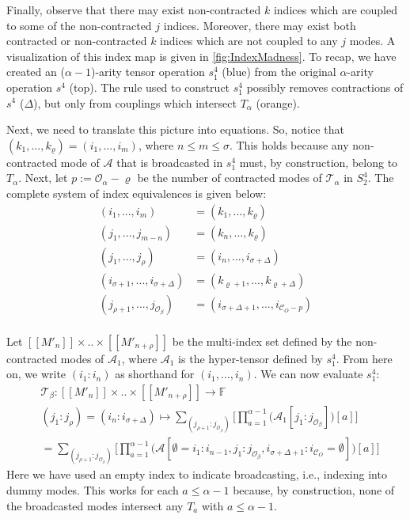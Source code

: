 \documentclass{article}
\theoremstyle{plain}
\theoremstyle{definition}
\theoremstyle{remark}
\newcommand{\cC}{\mathcal{C}}
\newcommand{\cO}{\mathcal{O}}
\newcommand{\cA}{\mathcal{A}}
\newcommand{\cT}{\mathcal{T}}
\begin{document}
Finally, observe that there may exist non-contracted $k$ indices which are coupled to some of the non-contracted $j$ indices. Moreover, there may exist both contracted or non-contracted $k$ indices which are not coupled to any $j$ modes. A visualization of this index map is given in \cref{fig:IndexMadness}. To recap, we have created an ($\alpha - 1$)-arity tensor operation $s^4_1$ ({\color{cyan}blue}) from the original $\alpha$-arity operation $s^4$ (top). The rule used to construct $s^4_1$ possibly removes contractions of $s^4$ ($\Delta$), but only from couplings which intersect $T_{\alpha}$ ({\color{orange}orange}).

Next, we need to translate this picture into equations. So, notice that $(k_1, ..., k_{\varrho}) = (i_1, ..., i_m)$, where $n \leq m \leq \sigma$. This holds because any non-contracted mode of $\cA$ that is broadcasted in $s^4_1$ must, by construction, belong to $T_{\alpha}$. Next, let $p := \cO_{\alpha} - \varrho$ be the number of contracted modes of $\cT_{\alpha}$ in $S^4_2$. The complete system of index equivalences is given below:
\begin{equation*}
	\begin{aligned}
		(i_1, ..., i_m) &= (k_1, ..., k_{\varrho})\\
		(j_1, ..., j_{m-n}) &= (k_n, ..., k_{\varrho})\\
		(j_1, ..., j_{\rho}) &= (i_n, ..., i_{\sigma + \Delta})\\
		(i_{\sigma + 1}, ..., i_{\sigma + \Delta}) &= (k_{\varrho + 1}, ..., k_{\varrho + \Delta})\\
		(j_{\rho + 1}, ..., j_{\cO_{\beta}}) &= (i_{\sigma + \Delta + 1}, ..., i_{\cC_O - p})\\
	\end{aligned}
\end{equation*}

Let $[[M'_n]]  \times .. \times [[M'_{n + \rho}]]$ be the multi-index set defined by the non-contracted modes of $\cA_1$, where $\cA_1$ is the hyper-tensor defined by $s^4_1$. From here on, we write $(i_1 : i_n)$ as shorthand for $(i_1, ..., i_n)$. We can now evaluate $s^4_1$:
\begin{equation}
	\begin{aligned}
		&\cT_{\beta}: [[M'_n]]  \times .. \times [[M'_{n + \rho}]] \rightarrow \mathbb{F}\\
		&(j_1 : j_{\rho}) = (i_n : i_{\sigma + \Delta}) \mapsto \sum_{(j_{\rho + 1} : j_{\cO_{\beta}})} \Bigg[ \prod_{a=1}^{\alpha - 1} \big(\cA_1[j_1 : j_{\cO_{\beta}}] \big)[a] \Bigg]\\
		&= \sum_{(j_{\rho + 1} : j_{\cO_{\beta}})} \Bigg[ \prod_{a=1}^{\alpha - 1} \big(\cA[\emptyset = i_1 : i_{n-1}, j_1 : j_{\cO_{\beta}}, i_{\sigma + \Delta + 1} : i_{\cC_O} = \emptyset] \big)[a] \Bigg]
	\end{aligned}
	\label{eq:S41}
\end{equation}
Here we have used an empty index to indicate broadcasting, i.e., indexing into dummy modes. This works for each $a \leq \alpha - 1$ because, by construction, none of the broadcasted modes intersect any $T_a$ with $a \leq \alpha - 1$.
\end{document}
